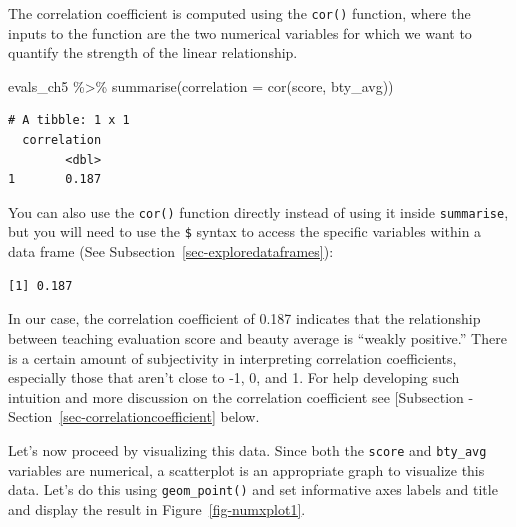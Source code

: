\documentclass[
  letterpaper,
  DIV=11,
  numbers=noendperiod]{scrreprt}
\newenvironment{Shaded}{\begin{snugshade}}{\end{snugshade}}
\newcommand{\AttributeTok}[1]{\textcolor[rgb]{0.40,0.45,0.13}{#1}}
\newcommand{\FunctionTok}[1]{\textcolor[rgb]{0.28,0.35,0.67}{#1}}
\newcommand{\NormalTok}[1]{\textcolor[rgb]{0.00,0.23,0.31}{#1}}
\newcommand{\SpecialCharTok}[1]{\textcolor[rgb]{0.37,0.37,0.37}{#1}}
\theoremstyle{definition}
\theoremstyle{remark}
\begin{document}
The correlation coefficient is computed using the \texttt{cor()}
function, where the inputs to the function are the two numerical
variables for which we want to quantify the strength of the linear
relationship.

\begin{Shaded}
\begin{Highlighting}[]
\NormalTok{evals\_ch5 }\SpecialCharTok{\%\textgreater{}\%} 
  \FunctionTok{summarise}\NormalTok{(}\AttributeTok{correlation =} \FunctionTok{cor}\NormalTok{(score, bty\_avg))}
\end{Highlighting}
\end{Shaded}

\begin{verbatim}
# A tibble: 1 x 1
  correlation
        <dbl>
1       0.187
\end{verbatim}

You can also use the \texttt{cor()} function directly instead of using
it inside \texttt{summarise}, but you will need to use the \texttt{\$}
syntax to access the specific variables within a data frame (See
Subsection~\ref{sec-exploredataframes}):

\begin{Shaded}
\end{Shaded}

\begin{verbatim}
[1] 0.187
\end{verbatim}

In our case, the correlation coefficient of 0.187 indicates that the
relationship between teaching evaluation score and beauty average is
``weakly positive.'' There is a certain amount of subjectivity in
interpreting correlation coefficients, especially those that aren't
close to -1, 0, and 1. For help developing such intuition and more
discussion on the correlation coefficient see {[}Subsection
-Section~\ref{sec-correlationcoefficient} below.

Let's now proceed by visualizing this data. Since both the
\texttt{score} and \texttt{bty\_avg} variables are numerical, a
scatterplot is an appropriate graph to visualize this data. Let's do
this using \texttt{geom\_point()} and set informative axes labels and
title and display the result in Figure~\ref{fig-numxplot1}.
\end{document}
